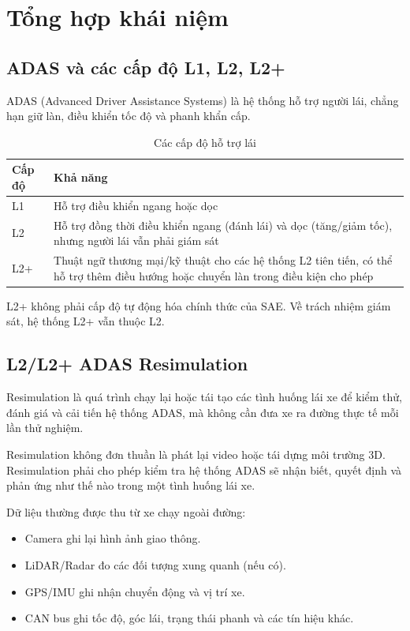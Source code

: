 \chapter{Tổng hợp khái niệm}

\section{ADAS và các cấp độ L1, L2, L2+}

ADAS (Advanced Driver Assistance Systems) là hệ thống hỗ trợ người lái, chẳng hạn giữ làn, điều khiển tốc độ và phanh khẩn cấp.

\begin{table}[H]
  \centering
  \caption{Các cấp độ hỗ trợ lái}
  \begin{tabularx}{\linewidth}{l X}
    \toprule
    \textbf{Cấp độ} & \textbf{Khả năng} \\
    \midrule
    L1 & Hỗ trợ điều khiển ngang hoặc dọc \\
    L2 & Hỗ trợ đồng thời điều khiển ngang (đánh lái) và dọc (tăng/giảm tốc), nhưng người lái vẫn phải giám sát \\
    L2+ & Thuật ngữ thương mại/kỹ thuật cho các hệ thống L2 tiên tiến, có thể hỗ trợ thêm điều hướng hoặc chuyển làn trong điều kiện cho phép \\
    \bottomrule
  \end{tabularx}
\end{table}

L2+ không phải cấp độ tự động hóa chính thức của SAE.
Về trách nhiệm giám sát, hệ thống L2+ vẫn thuộc L2.

\section{L2/L2+ ADAS Resimulation}

Resimulation là quá trình chạy lại hoặc tái tạo các tình huống lái xe để kiểm thử, đánh giá và cải tiến hệ thống ADAS, mà không cần đưa xe ra đường thực tế mỗi lần thử nghiệm.

Resimulation không đơn thuần là phát lại video hoặc tái dựng môi trường 3D.
Resimulation phải cho phép kiểm tra hệ thống ADAS sẽ nhận biết, quyết định và phản ứng như thế nào trong một tình huống lái xe.

Dữ liệu thường được thu từ xe chạy ngoài đường:
\begin{itemize}
  \item Camera ghi lại hình ảnh giao thông.
  \item LiDAR/Radar đo các đối tượng xung quanh (nếu có).
  \item GPS/IMU ghi nhận chuyển động và vị trí xe.
  \item CAN bus ghi tốc độ, góc lái, trạng thái phanh và các tín hiệu khác.
\end{itemize}

